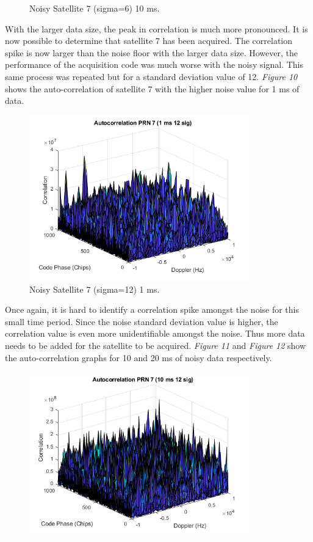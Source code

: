 \documentclass[11pt]{article}
\begin{document}
\begin{enumerate}[label=\textbf{\arabic*.}]
\begin{figure}[H]
        \caption{Noisy Satellite 7 (sigma=6) 10 ms.}
    \end{figure}
With the larger data size, the peak in correlation is much more pronounced. It is now possible to determine that satellite 7 has been acquired. The correlation spike is now larger than the noise floor with the larger data size. However, the performance of the acquisition code was much worse with the noisy signal. This same process was repeated but for a standard deviation value of 12. \emph{Figure 10} shows the auto-correlation of satellite 7 with the higher noise value for 1 ms of data.
    \begin{figure}[H]
        \centering
        \includegraphics[width=0.85\textwidth]{Lab_4_PRN7_12sig_1ms.png}
        \caption{Noisy Satellite 7 (sigma=12) 1 ms.}
    \end{figure}
Once again, it is hard to identify a correlation spike amongst the noise for this small time period. Since the noise standard deviation value is higher, the correlation value is even more unidentifiable amongst the noise. Thus more data needs to be added for the satellite to be acquired. \emph{Figure 11} and \emph{Figure 12} show the auto-correlation graphs for 10 and 20 ms of noisy data respectively. 
    \begin{figure}[H]
        \centering
        \includegraphics[width=0.85\textwidth]{Lab_4_PRN7_12sig_10ms.png}

\end{figure}
\end{enumerate}
\end{document}
